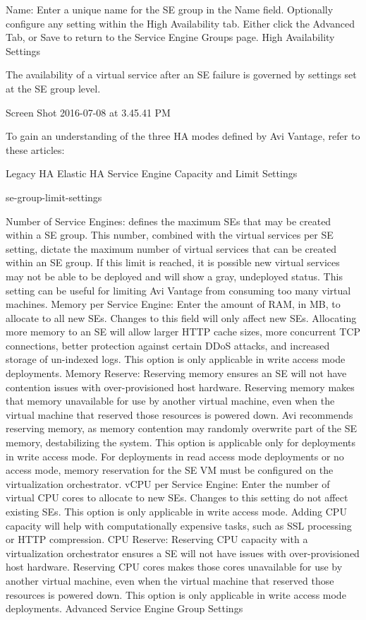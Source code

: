\documentclass[letterpaper,10pt,english]{sphinxmanual}
\begin{document}
Name: Enter a unique name for the SE group in the Name field.
Optionally configure any setting within the High Availability tab.
Either click the Advanced Tab, or Save to return to the Service Engine Groups page.
High Availability Settings

The availability of a virtual service after an SE failure is governed by settings set at the SE group level.

Screen Shot 2016-07-08 at 3.45.41 PM

To gain an understanding of the three HA modes defined by Avi Vantage, refer to these articles:

Legacy HA
Elastic HA
Service Engine Capacity and Limit Settings

se-group-limit-settings

Number of Service Engines: defines the maximum SEs that may be created within a SE group. This number, combined with the virtual services per SE setting, dictate the maximum number of virtual services that can be created within an SE group. If this limit is reached, it is possible new virtual services may not be able to be deployed and will show a gray, undeployed status. This setting can be useful for limiting Avi Vantage from consuming too many virtual machines.
Memory per Service Engine: Enter the amount of RAM, in MB, to allocate to all new SEs. Changes to this field will only affect new SEs. Allocating more memory to an SE will allow larger HTTP cache sizes, more concurrent TCP connections, better protection against certain DDoS attacks, and increased storage of un-indexed logs. This option is only applicable in write access mode deployments.
Memory Reserve: Reserving memory ensures an SE will not have contention issues with over-provisioned host hardware. Reserving memory makes that memory unavailable for use by another virtual machine, even when the virtual machine that reserved those resources is powered down. Avi recommends reserving memory, as memory contention may randomly overwrite part of the SE memory, destabilizing the system. This option is applicable only for deployments in write access mode. For deployments in read access mode deployments or no access mode, memory reservation for the SE VM must be configured on the virtualization orchestrator.
vCPU per Service Engine: Enter the number of virtual CPU cores to allocate to new SEs. Changes to this setting do not affect existing SEs. This option is only applicable in write access mode. Adding CPU capacity will help with computationally expensive tasks, such as SSL processing or HTTP compression.
CPU Reserve: Reserving CPU capacity with a virtualization orchestrator ensures a SE will not have issues with over-provisioned host hardware. Reserving CPU cores makes those cores unavailable for use by another virtual machine, even when the virtual machine that reserved those resources is powered down. This option is only applicable in write access mode deployments.
Advanced Service Engine Group Settings
\end{document}

